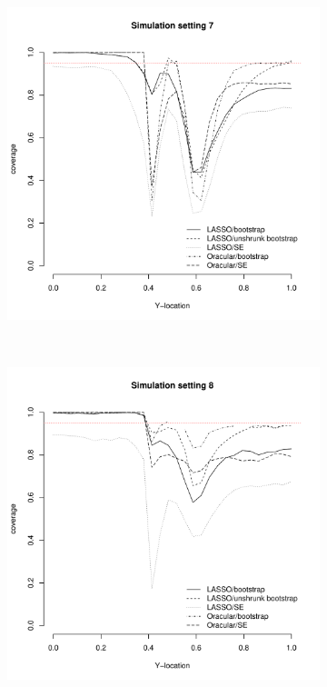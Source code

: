 \documentclass[authoryear, review, 11pt]{elsarticle}
\begin{document}
	
	\begin{figure}
		\centering
		\begin{subfigure}[b]{0.3\textwidth}
			\centering
			\includegraphics[width=\textwidth]{../../figures/simulation/28-7-profile-coverage.pdf}
			\label{fig:gull}
		\end{subfigure}%
        ~ %
		\begin{subfigure}[b]{0.3\textwidth}
			\centering
			\includegraphics[width=\textwidth]{../../figures/simulation/28-8-profile-coverage.pdf}

\end{subfigure}
\end{figure}
\end{document}
